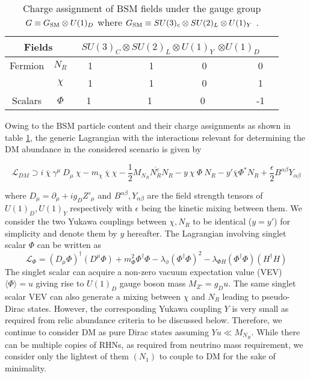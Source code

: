 \documentclass[prd,nofootinbib,preprint,superscriptaddress]{revtex4}
\begin{document}
	
	\begin{table}[h!]
			\begin{tabular}{|c|c|c|c|}
				\hline \multicolumn{2}{|c}{Fields}&  \multicolumn{1}{|c|}{ $ SU(3)_C \otimes SU(2)_L \otimes U(1)_Y $  $\otimes  U(1)_D $  } \\ \hline
				{Fermion} &  $N_R$&  ~~1 ~~~~~~~~~~~1~~~~~~~~~~0~~~~~~~~~~ 0 \\ [0.5em] 
				& $\chi$  & ~~1 ~~~~~~~~~~~1~~~~~~~~~~0~~~~~~~~~~ 1 \\
				[0.5em] \cline{1-3}
				{Scalars} & 
				$\Phi$ & ~~1 ~~~~~~~~~~~1~~~~~~~~~~0~~~~~~~~~~ -1 \\
				\hline
			\end{tabular}
			\caption{Charge assignment of BSM fields under the gauge group $G \equiv G_{\rm SM} \otimes U(1)_D$  where $G_{\rm SM}\equiv SU(3)_c \otimes SU(2)_L \otimes U(1)_Y$ .}
			\label{tab:tab2}
		\end{table}	
		
		Owing to the BSM particle content and their charge assignments as shown in table \ref{tab:tab2}, the generic Lagrangian with the interactions relevant for determining the DM abundance in the considered scenario is given by
		
		\begin{equation}
			\label{Lagrangian}
			\mathcal{L}_{DM} \supset i ~\overline{\chi}~ \gamma^\mu~ D_\mu~ \chi - m_{\chi} ~\overline{\chi} ~\chi -\frac{1}{2}M_{N_R} \overline{N^c_R} N_R-  y ~\chi ~\Phi~ N_R - y' \overline{\chi} \Phi^* N_R + \frac{\epsilon}{2}B^{\alpha \beta}Y_{\alpha\beta} 
		\end{equation}
		
		where $D_\mu = \partial_\mu + i g_D Z'_\mu$ and $B^{\alpha\beta}, Y_{\alpha \beta}$ are the field strength tensors of $U(1)_D, U(1)_Y$ respectively with $\epsilon$ being the kinetic mixing between them. {We consider the two Yukawa couplings between $\chi, N_R$ to be identical ($y = y'$) for simplicity and denote them by $y$ hereafter.} The Lagrangian involving singlet scalar $\Phi$ can be written as
		\begin{equation}
			\mathcal{L}_{\Phi} = (D_\mu \Phi)^\dagger (D^\mu \Phi) + m^2_\Phi \Phi^\dagger \Phi - \lambda_{\phi} (\Phi^{\dagger} \Phi)^2 -\lambda_{\Phi H} (\Phi^{\dagger} \Phi) (H^{\dagger} H)
			\label{scalarL}
		\end{equation}
		The singlet scalar can acquire a non-zero vacuum expectation value (VEV) $\langle \Phi \rangle =u$ giving rise to $U(1)_D$ gauge boson mass $M_{Z'}= g_D u$. The same singlet scalar VEV can also generate a mixing between $\chi$ and $N_R$ leading to pseudo-Dirac states. However, the corresponding Yukawa coupling $Y$ is very small as required from relic abundance criteria to be discussed below. Therefore, we continue to consider DM as pure Dirac states assuming $Y u \ll M_{N_R}$. While there can be multiple copies of RHNs, as required from neutrino mass requirement, we consider only the lightest of them $(N_1)$ to couple to DM for the sake of minimality. 
		
\end{document}
